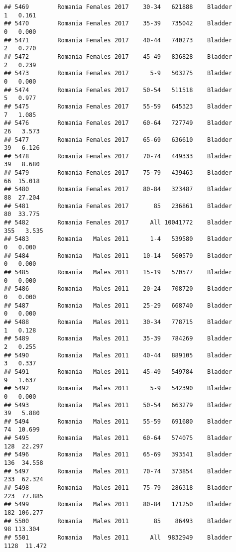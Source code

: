 \documentclass[
]{article}
\begin{document}
\begin{verbatim}
## 5469        Romania Females 2017    30-34   621888    Bladder      1   0.161
## 5470        Romania Females 2017    35-39   735042    Bladder      0   0.000
## 5471        Romania Females 2017    40-44   740273    Bladder      2   0.270
## 5472        Romania Females 2017    45-49   836828    Bladder      2   0.239
## 5473        Romania Females 2017      5-9   503275    Bladder      0   0.000
## 5474        Romania Females 2017    50-54   511518    Bladder      5   0.977
## 5475        Romania Females 2017    55-59   645323    Bladder      7   1.085
## 5476        Romania Females 2017    60-64   727749    Bladder     26   3.573
## 5477        Romania Females 2017    65-69   636610    Bladder     39   6.126
## 5478        Romania Females 2017    70-74   449333    Bladder     39   8.680
## 5479        Romania Females 2017    75-79   439463    Bladder     66  15.018
## 5480        Romania Females 2017    80-84   323487    Bladder     88  27.204
## 5481        Romania Females 2017       85   236861    Bladder     80  33.775
## 5482        Romania Females 2017      All 10041772    Bladder    355   3.535
## 5483        Romania   Males 2011      1-4   539580    Bladder      0   0.000
## 5484        Romania   Males 2011    10-14   560579    Bladder      0   0.000
## 5485        Romania   Males 2011    15-19   570577    Bladder      0   0.000
## 5486        Romania   Males 2011    20-24   708720    Bladder      0   0.000
## 5487        Romania   Males 2011    25-29   668740    Bladder      0   0.000
## 5488        Romania   Males 2011    30-34   778715    Bladder      1   0.128
## 5489        Romania   Males 2011    35-39   784269    Bladder      2   0.255
## 5490        Romania   Males 2011    40-44   889105    Bladder      3   0.337
## 5491        Romania   Males 2011    45-49   549784    Bladder      9   1.637
## 5492        Romania   Males 2011      5-9   542390    Bladder      0   0.000
## 5493        Romania   Males 2011    50-54   663279    Bladder     39   5.880
## 5494        Romania   Males 2011    55-59   691680    Bladder     74  10.699
## 5495        Romania   Males 2011    60-64   574075    Bladder    128  22.297
## 5496        Romania   Males 2011    65-69   393541    Bladder    136  34.558
## 5497        Romania   Males 2011    70-74   373854    Bladder    233  62.324
## 5498        Romania   Males 2011    75-79   286318    Bladder    223  77.885
## 5499        Romania   Males 2011    80-84   171250    Bladder    182 106.277
## 5500        Romania   Males 2011       85    86493    Bladder     98 113.304
## 5501        Romania   Males 2011      All  9832949    Bladder   1128  11.472

\end{verbatim}
\end{document}
